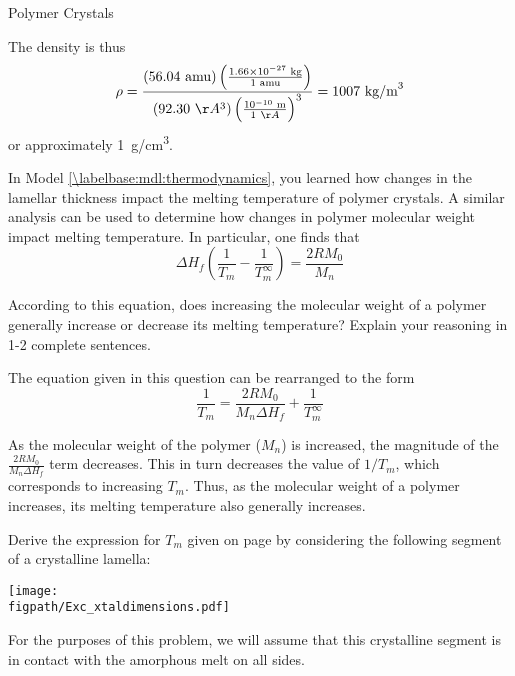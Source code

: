\begin{activity}{Polymer Crystals}
\begin{exercises}
\begin{solution}{}
		The density is thus
		\begin{align*}
			\rho = \frac{\left(56.04\text{ amu}\right)\left(\frac{1.66\times 10^{-27}\text{ kg}}{1\text{ amu}}\right)}{(92.30~\AA^3)\left(\frac{10^{-10}\text{ m}}{1~\AA}\right)^3} = 1007~\text{kg/m}^3
		\end{align*}
		or approximately 1~g/cm\textsuperscript{3}.
		
		\end{solution}
	
	\exercise In Model \ref{\labelbase:mdl:thermodynamics}, you learned how changes in the lamellar thickness impact the melting temperature of polymer crystals. A similar analysis can be used to determine how changes in polymer molecular weight impact melting temperature.  In particular, one finds that
		\begin{equation*}
			\Delta H_f\left(\frac{1}{T_m} - \frac{1}{T_m^\infty}\right) = \frac{2 R M_0}{M_n}
		\end{equation*}
		
		According to this equation, does increasing the molecular weight of a polymer generally increase or decrease its melting temperature?  Explain your reasoning in 1-2 complete sentences.
	
		\begin{solution}{}
		
		The equation given in this question can be rearranged to the form
		\begin{equation*}
			\frac{1}{T_m} = \frac{2RM_0}{M_n\Delta H_f} + \frac{1}{T_m^\infty}
		\end{equation*}
		
		As the molecular weight of the polymer ($M_n$) is increased, the magnitude of the 	$\frac{2RM_0}{M_n\Delta H_f}$ term decreases.  This in turn decreases the value of $1/T_m$, which corresponds to increasing $T_m$.  Thus, as the molecular weight of a polymer increases, its melting temperature also generally increases.	
		
		\end{solution}
		
	\exercise Derive the expression for $T_m$ given on page \pageref{\labelbase:info:lamellaeTmelt} by considering the following segment of a crystalline lamella: \label{\labelbase:exc:lamellaeTmelt}
	
		\centerline{\texttt{[image: \\figpath/Exc\_xtaldimensions.pdf]}}
		
		For the purposes of this problem, we will assume that this crystalline segment is in contact with the amorphous melt on all sides.
	

\end{exercises}
\end{activity}
